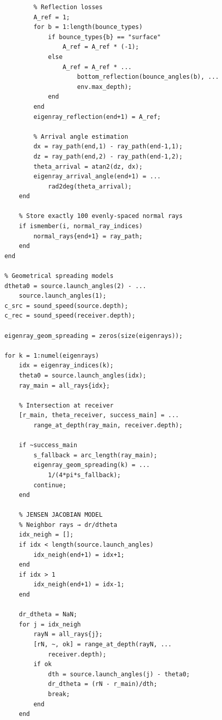 \documentclass[fleqn]{jaes}
\begin{document}
\begin{verbatim}
            % Reflection losses
            A_ref = 1;
            for b = 1:length(bounce_types)
                if bounce_types{b} == "surface"
                    A_ref = A_ref * (-1);
                else
                    A_ref = A_ref * ...
                        bottom_reflection(bounce_angles(b), ...
                        env.max_depth);
                end
            end
            eigenray_reflection(end+1) = A_ref;

            % Arrival angle estimation
            dx = ray_path(end,1) - ray_path(end-1,1);
            dz = ray_path(end,2) - ray_path(end-1,2);
            theta_arrival = atan2(dz, dx);
            eigenray_arrival_angle(end+1) = ...
                rad2deg(theta_arrival);
        end

        % Store exactly 100 evenly-spaced normal rays
        if ismember(i, normal_ray_indices)
            normal_rays{end+1} = ray_path;
        end
    end

    % Geometrical spreading models
    dtheta0 = source.launch_angles(2) - ...
        source.launch_angles(1);
    c_src = sound_speed(source.depth);
    c_rec = sound_speed(receiver.depth);

    eigenray_geom_spreading = zeros(size(eigenrays));

    for k = 1:numel(eigenrays)
        idx = eigenray_indices(k);
        theta0 = source.launch_angles(idx);
        ray_main = all_rays{idx};

        % Intersection at receiver
        [r_main, theta_receiver, success_main] = ...
            range_at_depth(ray_main, receiver.depth);

        if ~success_main
            s_fallback = arc_length(ray_main);
            eigenray_geom_spreading(k) = ...
                1/(4*pi*s_fallback);
            continue;
        end

        % JENSEN JACOBIAN MODEL
        % Neighbor rays → dr/dtheta
        idx_neigh = [];
        if idx < length(source.launch_angles)
            idx_neigh(end+1) = idx+1;
        end
        if idx > 1
            idx_neigh(end+1) = idx-1;
        end

        dr_dtheta = NaN;
        for j = idx_neigh
            rayN = all_rays{j};
            [rN, ~, ok] = range_at_depth(rayN, ...
                receiver.depth);
            if ok
                dth = source.launch_angles(j) - theta0;
                dr_dtheta = (rN - r_main)/dth;
                break;
            end
        end


\end{verbatim}
\end{document}

